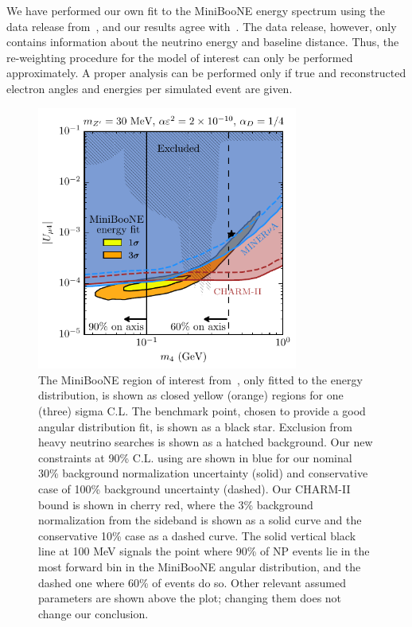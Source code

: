 We have performed our own fit to the MiniBooNE energy spectrum using the data release from~\cite{Aguilar-Arevalo:2018gpe}, and our results agree with~\cite{Bertuzzo:2018itn}. The data release, however, only contains information about the neutrino energy and baseline distance. Thus, the re-weighting procedure for the model of interest can only be performed approximately. A proper analysis can be performed only if true and reconstructed electron angles and energies per simulated event are given.  
%
\begin{figure}[t]
    \centering
    \includegraphics[width=3.38in]{bounds.pdf}
    \caption[New constraints on dark neutrinos.]{The MiniBooNE region of interest from~\cite{Bertuzzo:2018itn}, only fitted to the energy distribution, is shown as closed yellow (orange) regions for one (three) sigma C.L. The benchmark point, chosen to provide a good angular distribution fit, is shown as a black star. Exclusion from heavy neutrino searches is shown as a hatched background. Our new constraints at 90\% C.L. using \minerva are shown in blue for our nominal 30\% background normalization uncertainty (solid) and conservative case of 100\% background uncertainty (dashed). Our CHARM-II bound is shown in cherry red, where the 3\% background normalization from the sideband is shown as a solid curve and the conservative 10\% case as a dashed curve. The solid vertical black line at 100 MeV signals the point where 90\% of NP events lie in the most forward bin in the MiniBooNE angular distribution, and the dashed one where 60\% of events do so. Other relevant assumed parameters are shown above the plot; changing them does not change our conclusion.}
    \label{fig:final_plot}
\end{figure}
%

